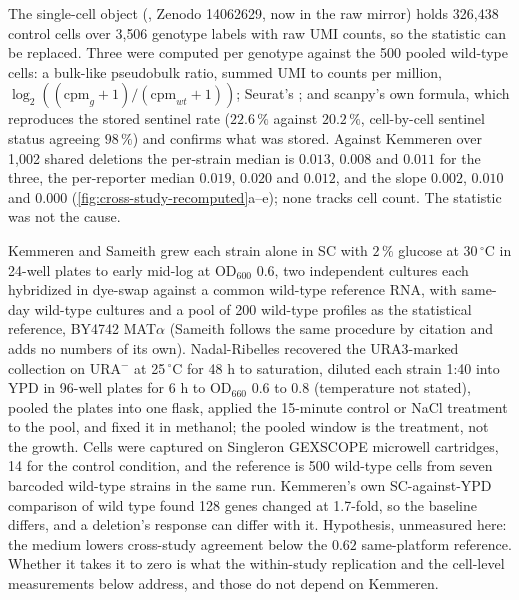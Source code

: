  The
single-cell object (, Zenodo 14062629, now in the raw mirror) holds
326{,}438 control cells over 3{,}506 genotype labels with raw UMI counts, so the statistic
can be replaced. Three were computed per genotype against the 500 pooled wild-type cells:
a bulk-like pseudobulk ratio, summed UMI to counts per million,
$\log_2((\mathrm{cpm}_g + 1)/(\mathrm{cpm}_{wt} + 1))$; Seurat's ; and
scanpy's own formula, which reproduces the stored sentinel rate ($22.6\,\%$ against
$20.2\,\%$, cell-by-cell sentinel status agreeing $98\,\%$) and confirms what was
stored. Against Kemmeren over 1{,}002 shared deletions the per-strain median is $0.013$,
$0.008$ and $0.011$ for the three, the per-reporter median $0.019$, $0.020$ and $0.012$,
and the slope $0.002$, $0.010$ and $0.000$ (\cref{fig:cross-study-recomputed}a--e); none
tracks cell count. The statistic was not the cause.

 Kemmeren and
Sameith grew each strain alone in SC with $2\,\%$ glucose at 30\,$^\circ$C in 24-well
plates to early mid-log at OD$_{600}$ 0.6, two independent cultures each hybridized in
dye-swap against a common wild-type reference RNA, with same-day wild-type cultures and a
pool of 200 wild-type profiles as the statistical reference, BY4742 MAT$\alpha$ (Sameith
follows the same procedure by citation and adds no numbers of its own). Nadal-Ribelles
recovered the URA3-marked collection on URA$^-$ at 25\,$^\circ$C for 48 h to saturation,
diluted each strain 1:40 into YPD in 96-well plates for 6 h to OD$_{660}$ 0.6 to 0.8
(temperature not stated), pooled the plates into one flask, applied the 15-minute
control or NaCl treatment to the pool, and fixed it in methanol; the pooled window is
the treatment, not the growth. Cells were captured on Singleron GEXSCOPE microwell
cartridges, 14 for the control condition, and the reference is 500 wild-type cells from
seven barcoded wild-type strains in the same run. Kemmeren's own SC-against-YPD
comparison of wild type found 128 genes changed at 1.7-fold, so the baseline differs, and
a deletion's response can differ with it. Hypothesis, unmeasured here: the medium lowers
cross-study agreement below the $0.62$ same-platform reference. Whether it takes it to
zero is what the within-study replication and the cell-level measurements below address,
and those do not depend on Kemmeren.

